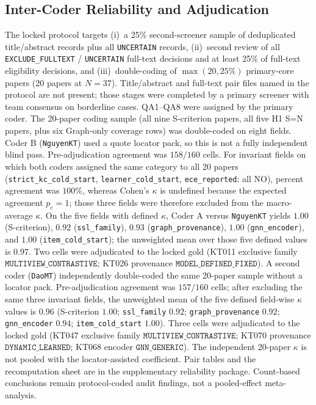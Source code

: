 \documentclass[lettersize,journal]{IEEEtran}
\begin{document}
\subsection{Inter-Coder Reliability and Adjudication}
\label{sec:icr}
The locked protocol targets (i)~a 25\% second-screener sample of deduplicated title/abstract records plus all \texttt{UNCERTAIN} records, (ii)~second review of all \texttt{EXCLUDE\_FULLTEXT} / \texttt{UNCERTAIN} full-text decisions and at least 25\% of full-text eligibility decisions, and (iii)~double-coding of $\max(20, 25\%)$ primary-core papers (20 papers at $N=37$). Title/abstract and full-text pair files named in the protocol are not present; those stages were completed by a primary screener with team consensus on borderline cases. QA1--QA8 were assigned by the primary coder. The 20-paper coding sample (all nine S-criterion papers, all five H1 S=N papers, plus six Graph-only coverage rows) was double-coded on eight fields. Coder B (\texttt{NguyenKT}) used a quote locator pack, so this is not a fully independent blind pass. Pre-adjudication agreement was $158/160$ cells. For invariant fields on which both coders assigned the same category to all 20 papers (\texttt{strict\_kc\_cold\_start}, \texttt{learner\_cold\_start}, \texttt{ece\_reported}: all NO), percent agreement was $100\%$, whereas Cohen's $\kappa$ is undefined because the expected agreement $p_e=1$; those three fields were therefore excluded from the macro-average $\kappa$. On the five fields with defined $\kappa$, Coder A versus \texttt{NguyenKT} yields $1.00$ (S-criterion), $0.92$ (\texttt{ssl\_family}), $0.93$ (\texttt{graph\_provenance}), $1.00$ (\texttt{gnn\_encoder}), and $1.00$ (\texttt{item\_cold\_start}); the unweighted mean over those five defined values is $0.97$. Two cells were adjudicated to the locked gold (KT011 exclusive family $\texttt{MULTIVIEW\_CONTRASTIVE}$; KT026 provenance $\texttt{MODEL\_DEFINED\_FIXED}$). A second coder (\texttt{DaoMT}) independently double-coded the same 20-paper sample without a locator pack. Pre-adjudication agreement was $157/160$ cells; after excluding the same three invariant fields, the unweighted mean of the five defined field-wise $\kappa$ values is $0.96$ (S-criterion $1.00$; \texttt{ssl\_family} $0.92$; \texttt{graph\_provenance} $0.92$; \texttt{gnn\_encoder} $0.94$; \texttt{item\_cold\_start} $1.00$). Three cells were adjudicated to the locked gold (KT047 exclusive family $\texttt{MULTIVIEW\_CONTRASTIVE}$; KT070 provenance $\texttt{DYNAMIC\_LEARNED}$; KT068 encoder $\texttt{GNN\_GENERIC}$). The independent 20-paper $\kappa$ is not pooled with the locator-assisted coefficient. Pair tables and the recomputation sheet are in the supplementary reliability package. Count-based conclusions remain protocol-coded audit findings, not a pooled-effect meta-analysis.
\end{document}
